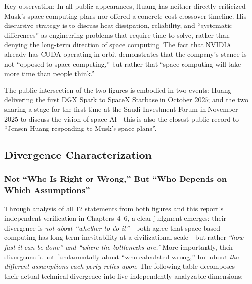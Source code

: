 Key observation: In all public appearances, Huang has neither directly criticized Musk's space computing plans nor offered a concrete cost-crossover timeline. His discursive strategy is to discuss heat dissipation, reliability, and ``systematic differences'' as engineering problems that require time to solve, rather than denying the long-term direction of space computing. The fact that NVIDIA already has CUDA operating in orbit demonstrates that the company's stance is not ``opposed to space computing,'' but rather that ``space computing will take more time than people think.''

The public intersection of the two figures is embodied in two events: Huang delivering the first DGX Spark to SpaceX Starbase in October 2025; and the two sharing a stage for the first time at the Saudi Investment Forum in November 2025 to discuss the vision of space AI---this is also the closest public record to ``Jensen Huang responding to Musk's space plans''\cite{musk_huang2025saudi}.

\subsection{Divergence Characterization}

\subsubsection{Not ``Who Is Right or Wrong,'' But ``Who Depends on Which Assumptions''}

Through analysis of all 12 statements from both figures and this report's independent verification in Chapters~4--6, a clear judgment emerges: their divergence is \emph{not about ``whether to do it''}---both agree that space-based computing has long-term inevitability at a civilizational scale---but rather \emph{``how fast it can be done'' and ``where the bottlenecks are.''} More importantly, their divergence is not fundamentally about ``who calculated wrong,'' but about \emph{the different assumptions each party relies upon}. The following table decomposes their actual technical divergence into five independently analyzable dimensions:

